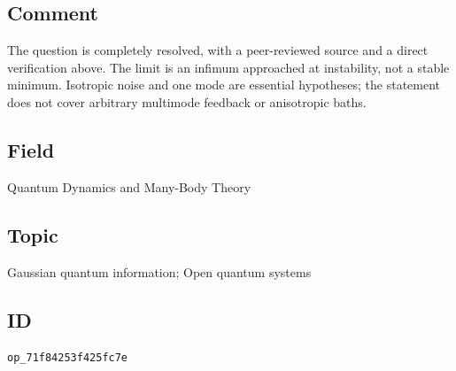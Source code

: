 \subsection*{Comment}

The question is completely resolved, with a peer-reviewed source and a direct verification above. The limit is an infimum approached at instability, not a stable minimum. Isotropic noise and one mode are essential hypotheses; the statement does not cover arbitrary multimode feedback or anisotropic baths.

\subsection*{Field}

Quantum Dynamics and Many-Body Theory

\subsection*{Topic}

Gaussian quantum information; Open quantum systems

\subsection*{ID}

\texttt{op\_71f84253f425fc7e}

